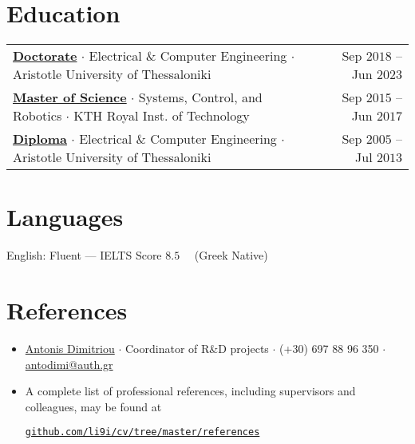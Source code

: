 \documentclass[a4paper,10pt,twoside]{article}
\newcommand{\verticalspacebetweensections}{\vspace{0.4em}}
\newcommand{\verticalspacebetweensectionandcontent}{\vspace{0.4em}}
\newcommand{\verticalspaceafteritem}{\vspace{-0.8em}}
\begin{document}
\section{\textbf{Education}}\verticalspacebetweensectionandcontent

{\hspace{-2em}
\begin{tabular}{l@{\hspace{1em}}r}
  \href{https://ikee.lib.auth.gr/record/354644}{\textbf{Doctorate}} $\cdot$ Electrical \& Computer Engineering $\cdot$ Aristotle University of Thessaloniki & {\small Sep $2018$ -- Jun $2023$} \\
  \href{http://kth.diva-portal.org/smash/record.jsf?pid=diva2\%3A1102597\&dswid=2875}{\textbf{Master of Science}} $\cdot$ Systems, Control, and Robotics $\cdot$ KTH Royal Inst. of Technology & {\small Sep $2015$ -- Jun $2017$} \\
  \href{https://ikee.lib.auth.gr/record/291560}{\textbf{Diploma}} $\cdot$ Electrical \& Computer Engineering $\cdot$ Aristotle University of Thessaloniki & {\small Sep $2005$ -- Jul $2013$}
\end{tabular}}
\verticalspacebetweensections

\section{\textbf{Languages}}\verticalspacebetweensectionandcontent
English: Fluent --- IELTS Score $8.5$ \ \ (Greek Native)
\verticalspacebetweensections

\section{\textbf{References}}\verticalspacebetweensectionandcontent
\begin{itemize}
  \item \href{https://gr.linkedin.com/in/antonis-dimitriou-21003452}{Antonis Dimitriou} $\cdot$ Coordinator of R\&D projects $\cdot$ (+30) 697 88 96 350 $\cdot$ \href{mailto:antodimi@auth.gr}{antodimi@auth.gr} \verticalspaceafteritem

\item A complete list of professional references, including supervisors and colleagues, may be found at\verticalspaceafteritem\vspace{0.5em}
\begin{center}\noindent
\href{https://mozilla.github.io/pdf.js/web/viewer.html?file=https://raw.githubusercontent.com/li9i/cv/master/references/references_alexandros_filotheou.pdf}{\texttt{github.com/li9i/cv/tree/master/references}}
\end{center}
\end{itemize}
\end{document}
